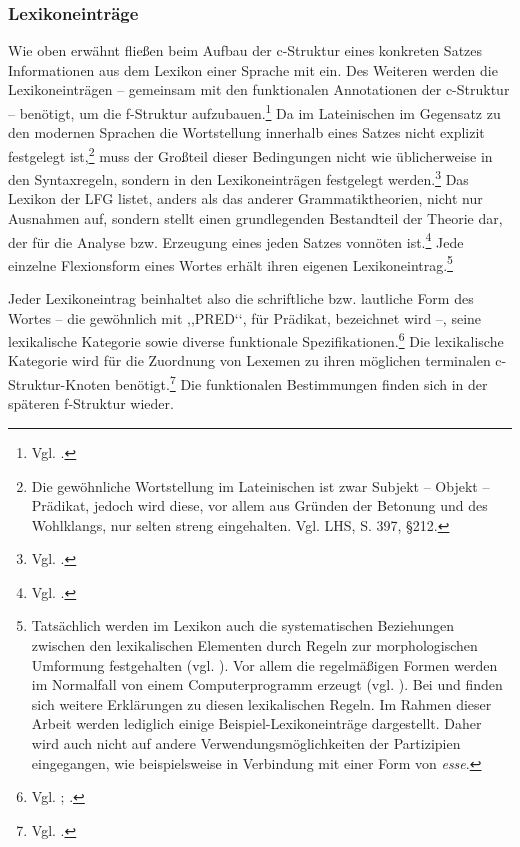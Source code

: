 \documentclass[12pt,a4paper]{article}
\begin{document}
\subsubsection{Lexikoneinträge}
Wie oben erwähnt fließen beim Aufbau der c-Struktur eines konkreten Satzes Informationen aus dem Lexikon einer Sprache mit ein. Des Weiteren werden die Lexikoneinträgen -- gemeinsam mit den funktionalen Annotationen der c-Struktur  -- benötigt, um die f-Struktur aufzubauen.\footnote{Vgl. \cite[63]{Skript}.} Da im Lateinischen im Gegensatz zu den modernen Sprachen die Wortstellung innerhalb eines Satzes nicht explizit festgelegt ist,\footnote{Die gewöhnliche Wortstellung im Lateinischen ist zwar Subjekt – Objekt – Prädikat, jedoch wird diese, vor allem aus Gründen der Betonung und des Wohlklangs, nur selten streng eingehalten. Vgl. LHS, S. 397, §212.} muss der Großteil dieser Bedingungen nicht wie üblicherweise in den Syntaxregeln, sondern in den Lexikoneinträgen festgelegt werden.\footnote{Vgl. \cite[6]{Bresnan}.} Das Lexikon der LFG listet, anders als das anderer Grammatiktheorien, nicht nur Ausnahmen auf, sondern stellt einen grundlegenden Bestandteil der Theorie dar, der für die Analyse bzw. Erzeugung eines jeden Satzes vonnöten ist.\footnote{Vgl. \cite[3]{Dal}.} Jede einzelne Flexionsform eines Wortes erhält ihren eigenen Lexikoneintrag.\footnote{Tatsächlich werden im Lexikon auch die systematischen Beziehungen zwischen den lexikalischen Elementen durch Regeln zur morphologischen Umformung festgehalten (vgl. \cite[3]{Dal}). Vor allem die regelmäßigen Formen werden im Normalfall von einem Computerprogramm erzeugt (vgl. \cite[15]{Rohrer}). Bei \cite[63-76]{Skript} und \cite[20-21]{Rohrer} finden sich weitere Erklärungen zu diesen lexikalischen Regeln. Im Rahmen dieser Arbeit werden lediglich einige Beispiel-Lexikoneinträge dargestellt. Daher wird auch nicht auf andere Verwendungsmöglichkeiten der Partizipien eingegangen, wie beispielsweise in Verbindung mit einer Form von \textit{esse}.}


Jeder Lexikoneintrag beinhaltet also die schriftliche bzw. lautliche Form des Wortes -- die gewöhnlich mit ,,PRED‘‘, für Prädikat, bezeichnet wird --, seine lexikalische Kategorie sowie diverse funktionale Spezifikationen.\footnote{Vgl. \cite[27; 33]{Rohrer}; \cite[16]{Skript}.} Die lexikalische Kategorie wird für die Zuordnung von Lexemen zu ihren möglichen terminalen c-Struktur-Knoten benötigt.\footnote{Vgl. \cite[63]{Skript}.} Die funktionalen Bestimmungen finden sich in der späteren f-Struktur wieder.
\end{document}
